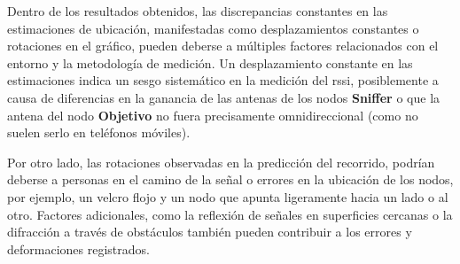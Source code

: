 Dentro de los resultados obtenidos, las discrepancias constantes en las estimaciones de ubicación, manifestadas como desplazamientos constantes o rotaciones en el gráfico, pueden deberse a múltiples factores relacionados con el entorno y la metodología de medición. Un desplazamiento constante en las estimaciones indica un sesgo sistemático en la medición del \acs{rssi}, posiblemente a causa de diferencias en la ganancia de las antenas de los nodos \textbf{Sniffer} o que la antena del nodo \textbf{Objetivo} no fuera precisamente omnidireccional (como no suelen serlo en teléfonos móviles).

Por otro lado, las rotaciones observadas en la predicción del recorrido, podrían deberse a personas en el camino de la señal o errores en la ubicación de los nodos, por ejemplo, un velcro flojo y un nodo que apunta ligeramente hacia un lado o al otro. Factores adicionales, como la reflexión de señales en superficies cercanas o la difracción a través de obstáculos también pueden contribuir a los errores y deformaciones registrados.